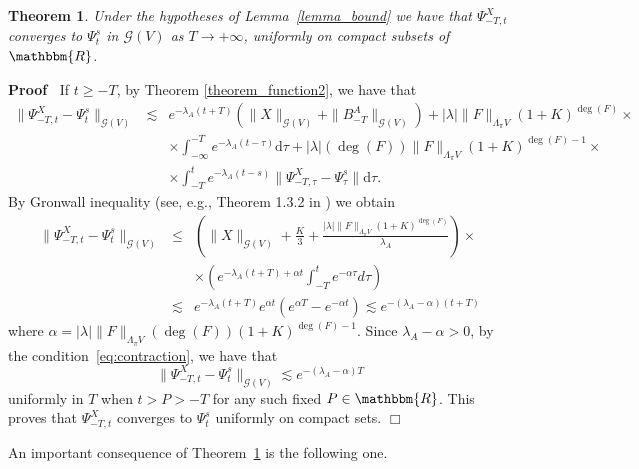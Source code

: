 \documentclass[11pt]{article}
\newcommand{\mathd}{\mathrm{d}}
\newenvironment{proof}{\noindent\textbf{Proof\ }}{\hspace*{\fill}$\Box$\medskip}
\newtheorem{theorem}{Theorem}
\begin{document}
\begin{theorem}
  \label{theorem_approximation}Under the hypotheses of Lemma~\ref{lemma_bound}
  we have that $\Psi_{- T, t}^X$ converges to $\Psi^s_t$ in $\mathcal{G} (V)$
  as $T \rightarrow + \infty$, uniformly on compact subsets of $\mathbbm{R}$.
\end{theorem}

\begin{proof}
  If $t \geqslant - T$, by Theorem \ref{theorem_function2}, we have that
  \begin{eqnarray}
    \| \Psi_{- T, t}^X - \Psi_t^s \|_{\mathcal{G} (V)} & \lesssim & e^{-
    \lambda_A (t + T)} (\| X \|_{\mathcal{G} (V)} + \| B_{- T}^A
    \|_{\mathcal{G} (V)}) + | \lambda | \| F \|_{\Lambda_{\pi} V} (1 +
    K)^{\deg (F)} \times \nonumber\\
    &  & \times \int_{- \infty}^{- T} e^{- \lambda_A (t - \tau)} \mathd \tau
    + | \lambda | (\deg (F)) \| F \|_{\Lambda_{\pi} V} (1 + K)^{\deg (F) - 1}
    \times \nonumber\\
    &  & \times \int_{- T}^t e^{- \lambda_A (t - s)} \| \Psi_{- T, \tau}^X -
    \Psi_{\tau}^s \| \mathd \tau . \nonumber
  \end{eqnarray}
  By Gronwall inequality (see, e.g., Theorem 1.3.2 in {\cite{Pachpatte1998}})
  we obtain
  \begin{eqnarray}
    \| \Psi_{- T, t}^X - \Psi_t^s \|_{\mathcal{G} (V)} & \leqslant & \left( \|
    X \|_{\mathcal{G} (V)} + \frac{K}{3} + \frac{| \lambda | \| F
    \|_{\Lambda_{\pi} V} (1 + K)^{\deg (F)}}{\lambda_A} \right) \times
    \nonumber\\
    &  & \times \left( e^{- \lambda_A (t + T) + \alpha t} \int_{- T}^t e^{-
    \alpha \tau} d \tau \right) \nonumber\\
    & \lesssim & e^{- \lambda_A (t + T)} e^{\alpha t} (e^{\alpha T} - e^{-
    \alpha t}) \lesssim e^{- (\lambda_A - \alpha) (t + T)} \nonumber
  \end{eqnarray}
  where $\alpha = | \lambda | \| F \|_{\Lambda_{\pi} V} (\deg (F)) (1 +
  K)^{\deg (F) - 1}$. Since $\lambda_A - \alpha > 0$, by the
  condition~{\eqref{eq:contraction}}, we have that
  \[ \| \Psi_{- T, t}^X - \Psi_t^s \|_{\mathcal{G} (V)} \lesssim e^{-
     (\lambda_A - \alpha) T} \]
  uniformly in $T$ when $t > P > - T$ for any such fixed $P \in \mathbbm{R}$.
  This proves that $\Psi_{- T, t}^X$ converges to $\Psi_t^s$ uniformly on
  compact sets.
\end{proof}

An important consequence of Theorem~\ref{theorem_approximation} is the
following one.
\end{document}
